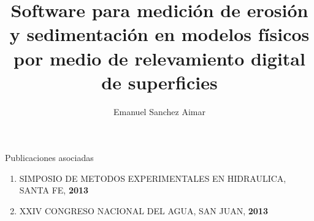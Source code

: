 \documentclass[12pt,screen,twoside,pagebackref]{tesis}
\title{Software para medici\'{o}n de erosi\'{o}n y sedimentaci\'{o}n en modelos f\'{i}sicos por medio de relevamiento digital de superficies}
\author{Emanuel Sanchez Aimar}
\begin{document}

\begin{preliminary}


\tableofcontents                %
\listoffigures                  %



\end{preliminary}











\begin{biblio}

\end{biblio}

\begin{postliminary}

\begin{seccion}{Publicaciones asociadas}
  \begin{enumerate}

  \item SIMPOSIO DE METODOS EXPERIMENTALES EN HIDRAULICA, SANTA FE, \textbf{2013}

  \item XXIV CONGRESO NACIONAL DEL AGUA, SAN JUAN, \textbf{2013}

  \end{enumerate}
\end{seccion}


\end{postliminary}
\end{document}
